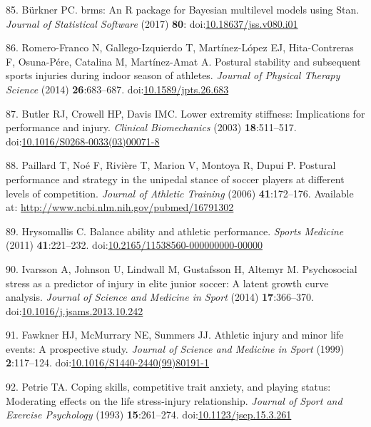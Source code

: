 \documentclass[
  english,
  man]{apa6}
\newenvironment{cslreferences}%
  {}%
  {\par}
\begin{document}
\begin{cslreferences}
\leavevmode\hypertarget{ref-Burkner2017a}{}%
85. Bürkner PC. brms: An R package for Bayesian multilevel models using Stan. \emph{Journal of Statistical Software} (2017) \textbf{80}: doi:\href{https://doi.org/10.18637/jss.v080.i01}{10.18637/jss.v080.i01}

\leavevmode\hypertarget{ref-Romero-Franco2014}{}%
86. Romero-Franco N, Gallego-Izquierdo T, Martínez-López EJ, Hita-Contreras F, Osuna-Pére, Catalina M, Martínez-Amat A. Postural stability and subsequent sports injuries during indoor season of athletes. \emph{Journal of Physical Therapy Science} (2014) \textbf{26}:683--687. doi:\href{https://doi.org/10.1589/jpts.26.683}{10.1589/jpts.26.683}

\leavevmode\hypertarget{ref-Butler2003}{}%
87. Butler RJ, Crowell HP, Davis IMC. Lower extremity stiffness: Implications for performance and injury. \emph{Clinical Biomechanics} (2003) \textbf{18}:511--517. doi:\href{https://doi.org/10.1016/S0268-0033(03)00071-8}{10.1016/S0268-0033(03)00071-8}

\leavevmode\hypertarget{ref-Paillard2006}{}%
88. Paillard T, Noé F, Rivière T, Marion V, Montoya R, Dupui P. Postural performance and strategy in the unipedal stance of soccer players at different levels of competition. \emph{Journal of Athletic Training} (2006) \textbf{41}:172--176. Available at: \url{http://www.ncbi.nlm.nih.gov/pubmed/16791302}

\leavevmode\hypertarget{ref-Hrysomallis2011}{}%
89. Hrysomallis C. Balance ability and athletic performance. \emph{Sports Medicine} (2011) \textbf{41}:221--232. doi:\href{https://doi.org/10.2165/11538560-000000000-00000}{10.2165/11538560-000000000-00000}

\leavevmode\hypertarget{ref-Ivarsson2014}{}%
90. Ivarsson A, Johnson U, Lindwall M, Gustafsson H, Altemyr M. Psychosocial stress as a predictor of injury in elite junior soccer: A latent growth curve analysis. \emph{Journal of Science and Medicine in Sport} (2014) \textbf{17}:366--370. doi:\href{https://doi.org/10.1016/j.jsams.2013.10.242}{10.1016/j.jsams.2013.10.242}

\leavevmode\hypertarget{ref-Fawkner1999}{}%
91. Fawkner HJ, McMurrary NE, Summers JJ. Athletic injury and minor life events: A prospective study. \emph{Journal of Science and Medicine in Sport} (1999) \textbf{2}:117--124. doi:\href{https://doi.org/10.1016/S1440-2440(99)80191-1}{10.1016/S1440-2440(99)80191-1}

\leavevmode\hypertarget{ref-Petrie1993}{}%
92. Petrie TA. Coping skills, competitive trait anxiety, and playing status: Moderating effects on the life stress-injury relationship. \emph{Journal of Sport and Exercise Psychology} (1993) \textbf{15}:261--274. doi:\href{https://doi.org/10.1123/jsep.15.3.261}{10.1123/jsep.15.3.261}


\end{cslreferences}
\end{document}
